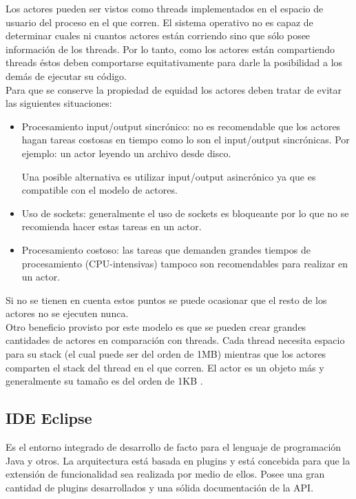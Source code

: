 \documentclass[12pt,a4paper]{article}
\begin{document}
Los actores pueden ser vistos como threads implementados en el espacio de usuario del proceso en el que corren. El
sistema operativo no es capaz de determinar cuales ni cuantos actores están corriendo sino que sólo posee información de los
threads. Por lo tanto, como los actores están compartiendo threads éstos deben comportarse equitativamente para darle la
posibilidad a los demás de ejecutar su código. \\

Para que se conserve la propiedad de equidad los actores deben tratar de evitar las siguientes situaciones:

\begin{itemize}
\item Procesamiento input/output sincrónico: no es recomendable que los actores hagan tareas costosas en tiempo como 
lo son el input/output sincrónicas. Por ejemplo: un actor leyendo un archivo desde disco.

Una posible alternativa es utilizar input/output asincrónico ya que es compatible con el modelo de actores.

\item Uso de sockets: generalmente el uso de sockets es bloqueante por lo que no se recomienda hacer estas
tareas en un actor.

\item Procesamiento costoso: las tareas que demanden grandes tiempos de procesamiento (CPU-intensivas)
tampoco son recomendables para realizar en un actor.
\end{itemize} 

Si no se tienen en cuenta estos puntos se puede ocasionar que el resto de los actores no se ejecuten nunca. \\

Otro beneficio provisto por este modelo es que se pueden crear grandes cantidades de actores en comparación con
threads. Cada thread necesita espacio para su stack (el cual puede ser del orden de 1MB) mientras que los actores
comparten el stack del thread en el que corren. El actor es un objeto más y generalmente su tamaño es del orden de 1KB
\cite{actores-size}.

\subsection{IDE Eclipse}
Es el entorno integrado de desarrollo de facto para el lenguaje de programación Java y otros. La arquitectura está
basada en plugins y está concebida para que la extensión de funcionalidad sea realizada por medio de ellos. 
Posee una gran cantidad de plugins desarrollados y una sólida documentación de la API.
\end{document}
